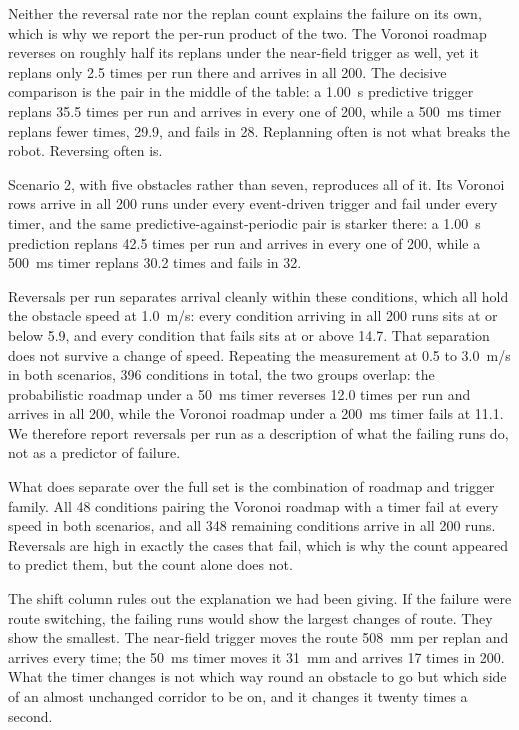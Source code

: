 Neither the reversal rate nor the replan count explains the failure on its own,
which is why we report the per-run product of the two. The Voronoi roadmap
reverses on roughly half its replans under the near-field trigger as well, yet
it replans only 2.5 times per run there and arrives in all 200. The decisive
comparison is the pair in the middle of the table: a 1.00~s predictive trigger
replans 35.5 times per run and arrives in every one of 200, while a 500~ms timer
replans fewer times, 29.9, and fails in 28. Replanning often is not what breaks
the robot. Reversing often is.

Scenario 2, with five obstacles rather than seven, reproduces all of it. Its
Voronoi rows arrive in all 200 runs under every event-driven trigger and fail
under every timer, and the same predictive-against-periodic pair is starker
there: a 1.00~s prediction replans 42.5 times per run and arrives in every one
of 200, while a 500~ms timer replans 30.2 times and fails in 32.

Reversals per run separates arrival cleanly within these conditions, which all
hold the obstacle speed at 1.0~m/s: every condition arriving in all 200 runs
sits at or below 5.9, and every condition that fails sits at or above 14.7.
That separation does not survive a change of speed. Repeating the measurement
at 0.5 to 3.0~m/s in both scenarios, 396 conditions in total, the two groups
overlap: the probabilistic roadmap under a 50~ms timer reverses 12.0 times per
run and arrives in all 200, while the Voronoi roadmap under a 200~ms timer
fails at 11.1. We therefore report reversals per run as a description of what
the failing runs do, not as a predictor of failure.

What does separate over the full set is the combination of roadmap and trigger
family. All 48 conditions pairing the Voronoi roadmap with a timer fail at
every speed in both scenarios, and all 348 remaining conditions arrive in all
200 runs. Reversals are high in exactly the cases that fail, which is why the
count appeared to predict them, but the count alone does not.

The shift column rules out the explanation we had been giving. If the failure
were route switching, the failing runs would show the largest changes of route.
They show the smallest. The near-field trigger moves the route 508~mm per replan
and arrives every time; the 50~ms timer moves it 31~mm and arrives 17 times in
200. What the timer changes is not which way round an obstacle to go but which
side of an almost unchanged corridor to be on, and it changes it twenty times a
second.

